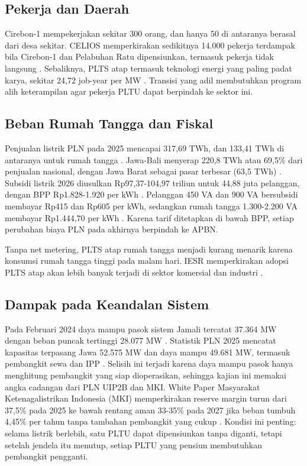 \subsection{Pekerja dan Daerah}

Cirebon-1 mempekerjakan sekitar 300 orang, dan hanya 50 di antaranya berasal dari desa sekitar. CELIOS memperkirakan sedikitnya 14.000 pekerja terdampak bila Cirebon-1 dan Pelabuhan Ratu dipensiunkan, termasuk pekerja tidak langsung \parencite{B-ECOBUSINESS-CIREBON}. Sebaliknya, PLTS atap termasuk teknologi energi yang paling padat karya, sekitar 24,72 job-year per MW \parencite{P-CEEW-2017}. Transisi yang adil membutuhkan program alih keterampilan agar pekerja PLTU dapat berpindah ke sektor ini.

\subsection{Beban Rumah Tangga dan Fiskal}

Penjualan listrik PLN pada 2025 mencapai 317,69 TWh, dan 133,41 TWh di antaranya untuk rumah tangga \parencite{B-CNBC-SALES-2025}. Jawa-Bali menyerap 220,8 TWh atau 69,5\% dari penjualan nasional, dengan Jawa Barat sebagai pasar terbesar (63,5 TWh) \parencite{D-PLN-STAT-2025}. Subsidi listrik 2026 diusulkan Rp97,37-104,97 triliun untuk 44,88 juta pelanggan, dengan BPP Rp1.828-1.920 per kWh \parencite{B-KONTAN-SUBSIDI-2026}. Pelanggan 450 VA dan 900 VA bersubsidi membayar Rp415 dan Rp605 per kWh, sedangkan rumah tangga 1.300-2.200 VA membayar Rp1.444,70 per kWh \parencite{B-KOMPASTV-TARIF-2026}. Karena tarif ditetapkan di bawah BPP, setiap perubahan biaya PLN pada akhirnya berpindah ke APBN.

Tanpa net metering, PLTS atap rumah tangga menjadi kurang menarik karena konsumsi rumah tangga tinggi pada malam hari. IESR memperkirakan adopsi PLTS atap akan lebih banyak terjadi di sektor komersial dan industri \parencite{B-PVMAG-QUOTA,P-IESR-PERMEN2}.

\subsection{Dampak pada Keandalan Sistem}

Pada Februari 2024 daya mampu pasok sistem Jamali tercatat 37.364 MW dengan beban puncak tertinggi 28.077 MW \parencite{B-MATAHARI-2024}. Statistik PLN 2025 mencatat kapasitas terpasang Jawa 52.575 MW dan daya mampu 49.681 MW, termasuk pembangkit sewa dan IPP \parencite{D-PLN-STAT-2025}. Selisih ini terjadi karena daya mampu pasok hanya menghitung pembangkit yang siap dioperasikan, sehingga kajian ini memakai angka cadangan dari PLN UIP2B dan MKI. White Paper Masyarakat Ketenagalistrikan Indonesia (MKI) memperkirakan reserve margin turun dari 37,5\% pada 2025 ke bawah rentang aman 33-35\% pada 2027 jika beban tumbuh 4,45\% per tahun tanpa tambahan pembangkit yang cukup \parencite{B-PETROMINDO-RESERVE}. Kondisi ini penting: selama listrik berlebih, satu PLTU dapat dipensiunkan tanpa diganti, tetapi setelah jendela itu menutup, setiap PLTU yang pensiun membutuhkan pembangkit pengganti.
